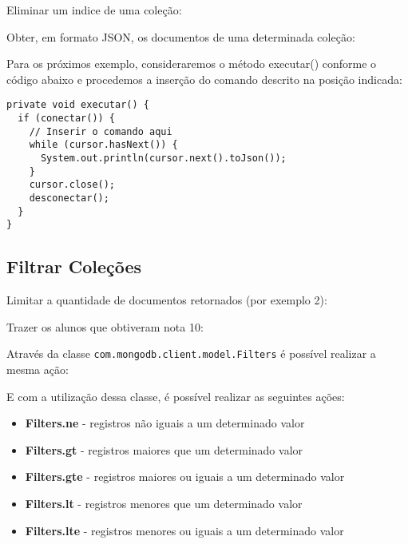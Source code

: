 Eliminar um indice de uma coleção: \\

Obter, em formato JSON, os documentos de uma determinada coleção: \\

Para os próximos exemplo, consideraremos o método executar() conforme o código abaixo e procedemos a inserção do comando descrito na posição indicada:
\begin{lstlisting}[]
private void executar() {
  if (conectar()) {
    // Inserir o comando aqui
    while (cursor.hasNext()) {
      System.out.println(cursor.next().toJson());
    }
    cursor.close();  
    desconectar();
  }
}
\end{lstlisting}

\subsection{Filtrar Coleções}
Limitar a quantidade de documentos retornados (por exemplo 2): \\

Trazer os alunos que obtiveram nota 10: \\

Através da classe \texttt{com.mongodb.client.model.Filters} é possível realizar a mesma ação: \\

E com a utilização dessa classe, é possível realizar as seguintes ações:
\begin{itemize}[nolistsep]
	\item \textbf{Filters.ne} - registros não iguais a um determinado valor
	\item \textbf{Filters.gt} - registros maiores que um determinado valor
	\item \textbf{Filters.gte} - registros maiores ou iguais a um determinado valor
	\item \textbf{Filters.lt} - registros menores que um determinado valor
	\item \textbf{Filters.lte} - registros menores ou iguais a um determinado valor
\end{itemize}

